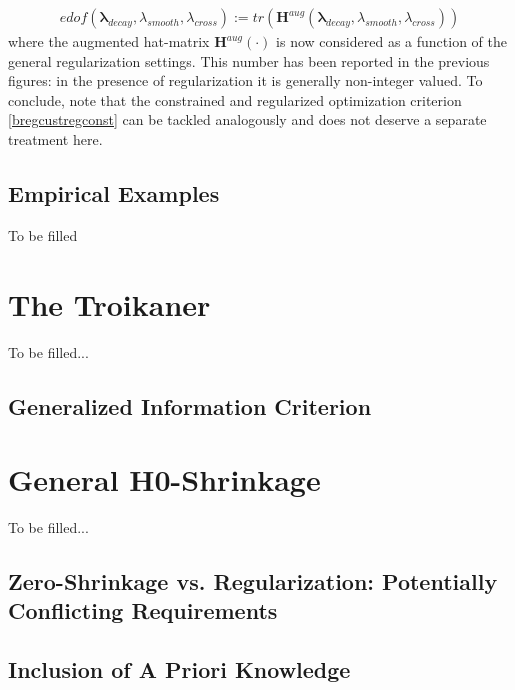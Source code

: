 \documentclass[a4paper]{book}
\begin{document}
\begin{eqnarray*}
edof(\boldsymbol{\lambda}_{decay},\lambda_{smooth},\lambda_{cross}):=tr(\mathbf{H}^{aug}(\boldsymbol{\lambda}_{decay},\lambda_{smooth},\lambda_{cross}))
\end{eqnarray*}
where the augmented hat-matrix $\mathbf{H}^{aug}(\cdot)$ is now considered as a function of the general regularization settings. This number has been reported in the previous figures: in the presence of regularization it is generally non-integer valued. To conclude, note that the constrained and regularized optimization criterion \ref{bregcustregconst} can be tackled analogously and does not deserve a separate treatment here.





\subsection{Empirical Examples}

To be filled












\section{The Troikaner}

To be filled...

\subsection{Generalized Information Criterion}



\section{General H0-Shrinkage}\label{h0_shrink}

To be filled...

\subsection{Zero-Shrinkage vs. Regularization: Potentially Conflicting Requirements}


\subsection{Inclusion of A Priori Knowledge}
\end{document}
